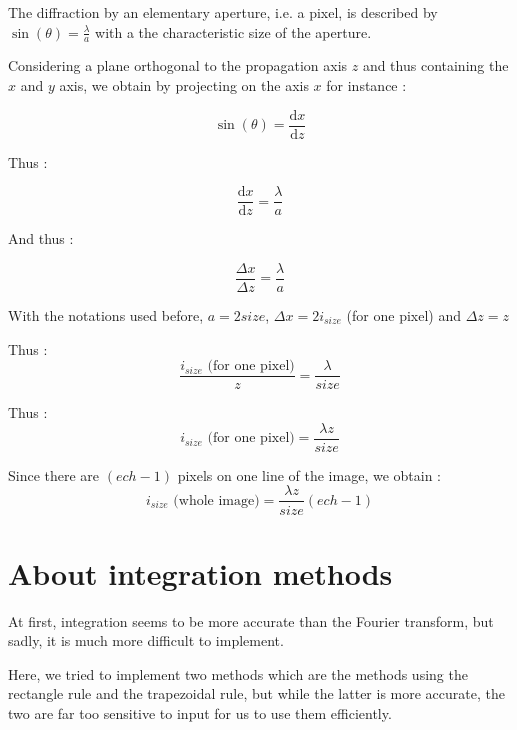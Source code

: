 \documentclass[10pt,a4paper]{article}
\begin{document}
The diffraction by an elementary aperture, i.e. a pixel, is described by
$\sin(\theta)= \frac{\lambda}{a}$  with a the characteristic size of the aperture. 

Considering a plane orthogonal to the propagation axis $z$ and thus containing the $x$ and $y$ axis, we obtain by projecting on the axis $x$ for instance :

\[\sin(\theta)=\frac{\mathrm{d}x}{\mathrm{d}z}\]

Thus :

\[\frac{\mathrm{d}x}{\mathrm{d}z}= \frac{\lambda}{a}\]

And thus :

\[\frac{\Delta x}{\Delta z}= \frac{\lambda}{a}\]

With the notations used before, $a=2size$, $\Delta x=2i_{size}$ (for one pixel) and $\Delta z = z$

Thus :
\[\frac{i_{size}\text{ (for one pixel)}}{z}=\frac{\lambda}{size}\]

Thus :
\[i_{size}\text{ (for one pixel)}=\frac{\lambda z}{size}\]

Since there are $(ech-1)$ pixels on one line of the image, we obtain :
\[i_{size}\text{ (whole image)}=\frac{\lambda z}{size}(ech-1)\]
\section{About integration methods}
At first, integration seems to be more accurate than the Fourier transform, but sadly, it is much more difficult to implement.

Here, we tried to implement two methods which are the methods using the rectangle rule and the trapezoidal rule, but while the latter is more accurate, the two are far too sensitive to input for us to use them efficiently.
\end{document}
